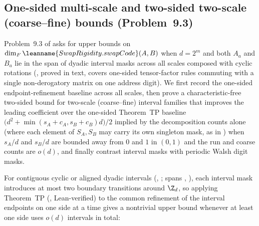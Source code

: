 \subsection{One-sided multi-scale and two-sided two-scale (coarse--fine) bounds (Problem~9.3)}\label{sec:problem-9-3}

Problem~9.3 of \cite{SeventeenthPaper2026} asks for upper bounds on
$\dim_F \leanname{SwapRigidity.swapCode}(A, B)$ when $d = 2^m$ and both $A_a$ and $B_a$ lie in the
span of dyadic interval masks across all scales composed with cyclic rotations
(\cite[Corollary~6.13]{SeventeenthPaper2026}, proved in text, covers one-sided tensor-factor
rules commuting with a single non-derogatory matrix on one address digit). We first record the
one-sided endpoint-refinement baseline across all scales, then prove a characteristic-free two-sided
bound for two-scale (coarse--fine) interval families that improves the leading coefficient over the
one-sided Theorem~TP baseline $\bigl(d^2 + \min(s_A + c_A, s_B + c_B)d\bigr)/2$ implied by the
decomposition counts alone (where each element of $S_A, S_B$ may carry its own singleton mask, as in
) when $s_A/d$ and $s_B/d$ are bounded away from $0$ and $1$ in $(0, 1)$
and the run and coarse counts are
$o(d)$, and finally contrast interval masks with periodic Walsh digit masks.

For contiguous cyclic or aligned dyadic intervals (,
; spans ,
), each interval mask introduces at most two boundary
transitions around $\Z_d$, so applying Theorem~TP (\cite[Theorem~6.4]{SeventeenthPaper2026},
Lean-verified) to the
common refinement of the interval endpoints on one side at a time gives a nontrivial upper bound
whenever at least one side uses $o(d)$ intervals in total:

